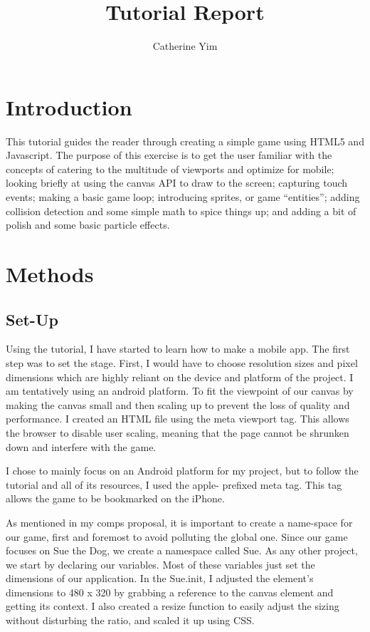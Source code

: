 \documentclass[10pt,twocolumn]{article}
\title{Tutorial Report}
\author{Catherine Yim}
\affiliation{Occidental College}
\begin{document}
\maketitle
\section{Introduction}
This tutorial guides the reader through creating a simple game using HTML5 and Javascript. The purpose of this exercise is to get the user familiar with the concepts of catering to the multitude of viewports and optimize for mobile; looking briefly at using the canvas API to draw to the screen; capturing touch events; making a basic game loop; introducing sprites, or game “entities”; adding collision detection and some simple math to spice things up; and adding a bit of polish and some basic particle effects. 

\section{Methods}

\subsection{Set-Up}

Using the tutorial, I have started to learn how to make a mobile app. The first step was to set the stage. First, I would have to choose resolution sizes and pixel dimensions which are highly reliant on the device and platform of the project. I am tentatively using an android platform. To fit the viewpoint of our canvas by making the canvas small and then scaling up to prevent the loss of quality and performance. I created an HTML file using the meta viewport tag. This allows the browser to disable user scaling, meaning that the page cannot be shrunken down and interfere with the game. 

I chose to mainly focus on an Android platform for my project, but to follow the tutorial and all of its resources, I used the apple- prefixed meta tag. This tag allows the game to be bookmarked on the iPhone. 

As mentioned in my comps proposal, it is important to create a name-space for our game, first and foremost to avoid polluting the global one. Since our game focuses on Sue the Dog, we create a namespace called Sue. As any other project, we start by declaring our variables. Most of these variables just set the dimensions of our application. In the Sue.init, I adjusted the element’s dimensions to 480 x 320 by grabbing a reference to the canvas element and getting its context. I also created a resize function to easily adjust the sizing without disturbing the ratio, and scaled it up using CSS. 
\end{document}
